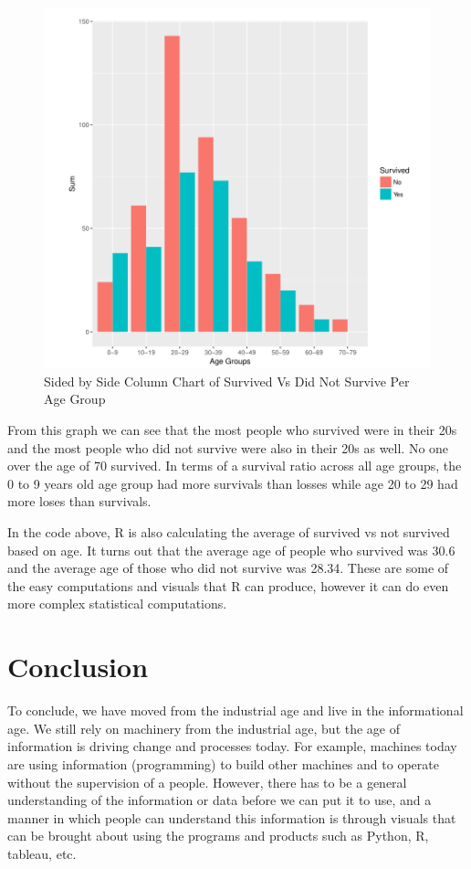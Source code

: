 \documentclass[sigconf]{acmart}
\begin{document}
\begin{figure}[htb]
  \centering
  \includegraphics[width=1.0\columnwidth]{paper2/Graph 6.png}
  \caption{Sided by Side Column Chart of Survived Vs Did Not Survive Per Age Group
  \cite{Tibenkana and Driscoll, Data Set from Kaggle}}
  \label{fig:Graph 6} 
\end{figure}

From this graph we can see that the most people who survived were in their 20s and the most people who did not survive were also in their 20s as well. No one over the age of 70 survived. In terms of a survival ratio across all age groups, the 0 to 9 years old age group had more survivals than losses while age 20 to 29 had more loses than survivals.

In the code above, R is also calculating the average of survived vs not survived based on age. It turns out that the average age of people who survived was 30.6 and the average age of those who did not survive was 28.34. These are some of the easy computations and visuals that R can produce, however it can do even more complex statistical computations. 

\section{Conclusion} 
To conclude, we have moved from the industrial age and live in the informational age. We still rely on machinery from the industrial age, but the age of information is driving change and processes today. For example, machines today are using information (programming) to build other machines and to operate without the supervision of a people. However, there has to be a general understanding of the information or data before we can put it to use, and a manner in which people can understand this information is through visuals that can be brought about using the programs and products such as Python, R, tableau, etc.
 
\end{document}
